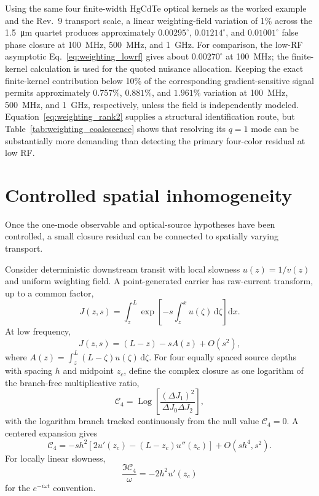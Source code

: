 \documentclass[11pt]{article}
\newcommand{\Cfour}{\mathcal{C}_4}
\newcommand{\dd}{\mathrm{d}}
\begin{document}
Using the same four finite-width HgCdTe optical kernels as the worked example and the Rev.~9 transport scale, a linear weighting-field variation of 1\% across the \SI{1.5}{\micro\meter} quartet produces approximately $0.00295^\circ$, $0.01214^\circ$, and $0.01001^\circ$ false phase closure at \SI{100}{MHz}, \SI{500}{MHz}, and \SI{1}{GHz}. For comparison, the low-RF asymptotic Eq.~\eqref{eq:weighting_lowrf} gives about $0.00270^\circ$ at \SI{100}{MHz}; the finite-kernel calculation is used for the quoted nuisance allocation. Keeping the exact finite-kernel contribution below 10\% of the corresponding gradient-sensitive signal permits approximately $0.757\%$, $0.881\%$, and $1.961\%$ variation at \SI{100}{MHz}, \SI{500}{MHz}, and \SI{1}{GHz}, respectively, unless the field is independently modeled. Equation~\eqref{eq:weighting_rank2} supplies a structural identification route, but Table~\ref{tab:weighting_coalescence} shows that resolving its $q=1$ mode can be substantially more demanding than detecting the primary four-color residual at low RF.

\section{Controlled spatial inhomogeneity}

Once the one-mode observable and optical-source hypotheses have been controlled, a small closure residual can be connected to spatially varying transport.

Consider deterministic downstream transit with local slowness $u(z)=1/v(z)$ and uniform weighting field. A point-generated carrier has raw-current transform, up to a common factor,
\begin{equation}
J(z,s)=\int_z^L
\exp\left[-s\int_z^x u(\zeta)\,\dd \zeta\right]\dd x.
\label{eq:Jvarying}
\end{equation}
At low frequency,
\begin{equation}
J(z,s)=(L-z)-sA(z)+O(s^2),
\end{equation}
where $A(z)=\int_z^L(L-\zeta)u(\zeta)\,\dd \zeta$. For four equally spaced source depths with spacing $h$ and midpoint $z_c$, define the complex closure as one logarithm of the branch-free multiplicative ratio,
\begin{equation}
\boxed{
\Cfour=\operatorname{Log}\!\left[\frac{(\Delta J_1)^2}{\Delta J_0\Delta J_2}\right],}
\label{eq:C4_logratio}
\end{equation}
with the logarithm branch tracked continuously from the null value $\Cfour=0$. A centered expansion gives
\begin{equation}
\boxed{
\Cfour=-s h^2\left[2u'(z_c)-(L-z_c)u''(z_c)\right]
+O(sh^4,s^2).}
\label{eq:gradienttheorem}
\end{equation}
For locally linear slowness,
\begin{equation}
\boxed{
\frac{\Im\Cfour}{\omega}=-2h^2u'(z_c)}
\label{eq:linearq}
\end{equation}
for the $e^{-i\omega t}$ convention.
\end{document}
